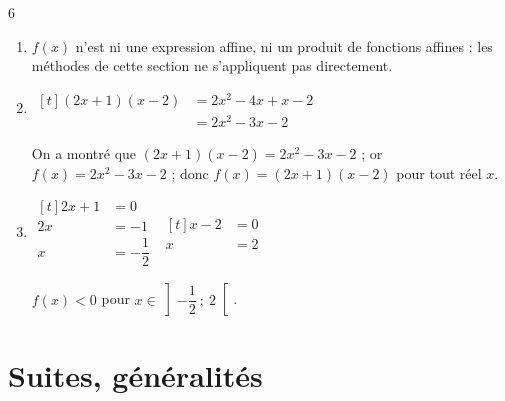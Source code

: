 \documentclass[10pt,a4paper]{article}
\begin{document}
\begin{corr}{6}
\begin{enumerate}[leftmargin=*]
    \item \(f(x)\) n'est ni une expression affine, ni un produit de fonctions affines : les méthodes de cette section ne s'appliquent pas directement.
    \item \(\begin{aligned}[t] (2x+1)(x-2)&=2x^2-4x+x-2\\ &=2x^2-3x-2\end{aligned}\)

    On a montré que \((2x+1)(x-2)=2x^2-3x-2\) ; or \(f(x)=2x^2-3x-2\) ; donc \(f(x)=(2x+1)(x-2)\) pour tout réel \(x\).
    \item \(\begin{aligned}[t] 2x+1&=0\\ 2x&=-1\\ x&=-\dfrac{1}{2}\end{aligned}\) \qquad \(\begin{aligned}[t] x-2&=0\\ x&=2\end{aligned}\)
    \begin{center}
    \end{center}
    \(f(x)<0\) pour \(x\in\left]-\dfrac{1}{2}\ ;\ 2\right[\).
\end{enumerate}
\end{corr}

\section{Suites, généralités}
\end{document}

